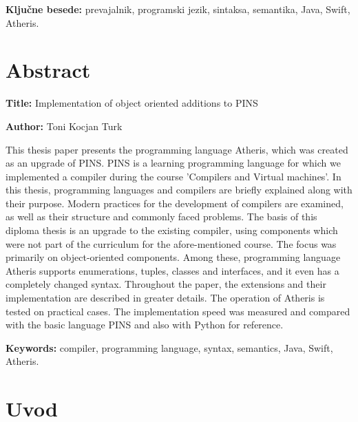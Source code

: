 \documentclass[a4paper, 12p]{book}
\newcommand{\ttitleEn}{Implementation of object oriented additions to PINS}
\newcommand{\tauthor}{Toni Kocjan Turk}
\newcommand{\tkeywords}{prevajalnik, programski jezik, sintaksa, semantika, Java, Swift, Atheris}
\newcommand{\tkeywordsEn}{compiler, programming language, syntax, semantics, Java, Swift, Atheris}
\newcommand{\clearemptydoublepage}{\newpage{\pagestyle{empty}\cleardoublepage}}
\begin{document}
\noindent 

\bigskip

\noindent\textbf{Ključne besede:} \tkeywords.
\clearemptydoublepage

\chapter*{Abstract}

\noindent\textbf{Title:} \ttitleEn
\bigskip

\noindent\textbf{Author:} \tauthor
\bigskip

\noindent This thesis paper presents the programming language Atheris, which was created as an upgrade of PINS. PINS is a learning programming language for which we implemented a compiler during the course 'Compilers and Virtual machines'. In this thesis, programming languages and compilers are briefly explained along with their purpose. Modern practices for the development of compilers are examined, as well as their structure and commonly faced problems. The basis of this diploma thesis	is an upgrade to the existing compiler, using components which were not part of the curriculum for the afore-mentioned course. The focus was primarily on object-oriented components. Among these, programming language Atheris supports enumerations, tuples, classes and interfaces, and it even has a completely changed syntax. Throughout the paper, the extensions and their implementation are described in greater details.
The operation of Atheris is tested on practical cases. The implementation speed was measured and compared with the basic language PINS and also with Python for reference.
\bigskip

\noindent\textbf{Keywords:} \tkeywordsEn.
\clearemptydoublepage

\mainmatter
\setcounter{page}{1}
\pagestyle{fancy}

\chapter{Uvod}
\end{document}
